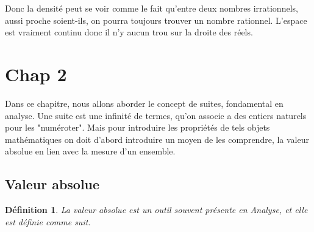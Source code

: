 \documentclass[a4paper, 12pt, french, twoside]{article}
\newtheorem{theorem}{Théorème}[section]
\newtheorem{defi}[theorem]{Définition}
\newcommand{\Nn}{{\mathbb{N}}}
\newcommand{\Zz}{{\mathbb{Z}}}
\newcommand{\Rr}{{\mathbb{R}}}
\newcommand{\Qq}{{\mathbb{Q}}}
\begin{document}
    


Donc la densité peut se voir comme le fait qu'entre deux nombres irrationnels, aussi proche soient-ils, on pourra toujours trouver un nombre rationnel. L'espace est vraiment continu donc il n'y aucun trou sur la droite des réels. 



\newpage
\section{Chap 2}
Dans ce chapitre, nous allons aborder le concept de suites, fondamental en analyse. Une suite est une infinité de termes, qu'on associe a des entiers naturels pour les "numéroter". Mais pour introduire les propriétés de tels objets mathématiques on doit d'abord introduire un moyen de les comprendre, la valeur absolue en lien avec la mesure d'un ensemble.
\subsection{Valeur absolue }
\begin{defi}
    La valeur absolue est un outil souvent présente en Analyse, et elle est définie comme suit.
\end{defi} 
\end{document}
